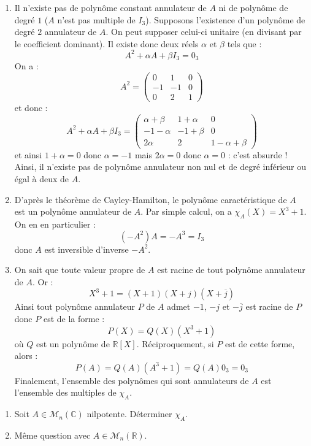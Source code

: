 \documentclass[a4paper,10pt]{report}
\begin{document}
\corr \begin{enumerate}
\item Il n'existe pas de polynôme constant annulateur de $A$ ni de polynôme de degré $1$ ($A$ n'est pas multiple de $I_3$). Supposons l'existence d'un polynôme de degré $2$ annulateur de $A$. On peut supposer celui-ci unitaire (en divisant par le coefficient dominant). Il existe donc deux réels $\alpha$ et $\beta$ tels que :
$$ A^2 + \alpha A + \beta I_3 = 0_3$$
On a :
$$ A^2 = \begin{pmatrix}
0 & 1 & 0 \\
-1 & -1 & 0 \\
0 & 2 & 1 
\end{pmatrix}$$
et donc :
$$ A^2+ \alpha A + \beta I_3 = \begin{pmatrix}
\alpha+ \beta & 1+ \alpha & 0 \\
-1- \alpha & -1+ \beta & 0 \\
2 \alpha & 2 & 1  - \alpha + \beta
\end{pmatrix}$$
et ainsi $1+ \alpha = 0$ donc $\alpha =-1$ mais $2 \alpha = 0$ donc $\alpha = 0$ : c'est absurde ! Ainsi, il n'existe pas de polynôme annulateur non nul et de degré inférieur ou égal à deux de $A$.
\item D'après le théorème de Cayley-Hamilton, le polynôme caractéristique de $A$ est un polynôme annulateur de $A$. Par simple calcul, on a $\chi_A(X) = X^3+1$. On en en particulier :
$$ (-A^2)A= -A^3 = I_3$$
donc $A$ est inversible d'inverse $-A^2$.
\item On sait que toute valeur propre de $A$ est racine de tout polynôme annulateur de $A$. Or :
$$ X^3+1 = (X+1) (X+j)(X+ \overline{j})$$
Ainsi tout polynôme annulateur $P$ de $A$ admet $-1$, $-j$ et $- \overline{j}$ est racine de $P$ donc $P$ est de la forme :
$$ P(X)= Q(X) (X^3+1)$$
où $Q$ est un polynôme de $\mathbb{R}[X]$. Réciproquement, si $P$ est de cette forme, alors :
$$ P(A) = Q(A)(A^3+1) = Q(A) 0_3 = 0_3$$
Finalement, l'ensemble des polynômes qui sont annulateurs de $A$ est l'ensemble des multiples de $\chi_A$.
\end{enumerate}

\begin{Exercice}{}
  \begin{enumerate}
  \item  Soit $A \in \mathcal{M}_{n}(\mathbb{C})$ nilpotente. Déterminer $\chi_{A}$.
  \item Même question avec $A \in \mathcal{M}_{n}(\mathbb{R})$.
  \end{enumerate}
\end{Exercice} 
\end{document}
